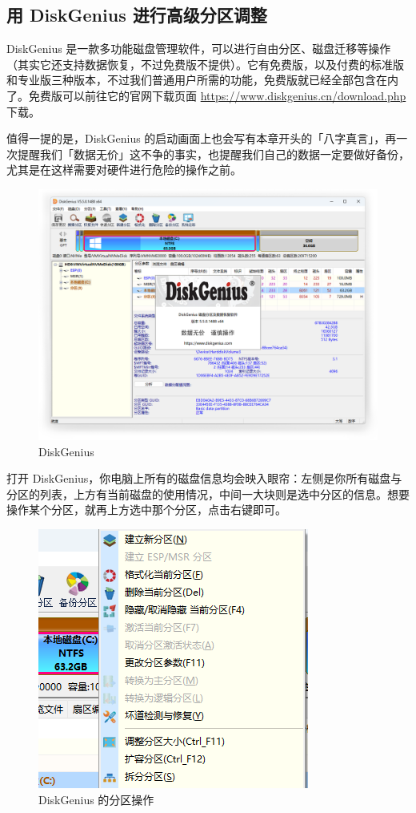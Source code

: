{\subsection{用 DiskGenius 进行高级分区调整}

DiskGenius 是一款多功能磁盘管理软件，可以进行自由分区、磁盘迁移等操作（其实它还支持数据恢复，不过免费版不提供）。它有免费版，以及付费的标准版和专业版三种版本，不过我们普通用户所需的功能，免费版就已经全部包含在内了。免费版可以前往它的官网下载页面 \url{https://www.diskgenius.cn/download.php} 下载。

值得一提的是，DiskGenius 的启动画面上也会写有本章开头的「八字真言」，再一次提醒我们「数据无价」这不争的事实，也提醒我们自己的数据一定要做好备份，尤其是在这样需要对硬件进行危险的操作之前。

\begin{figure}[htb!]
  \centering
  \includegraphics[width=.7\textwidth]{assets/advanced/DiskGenius.png}
  \caption{DiskGenius}
  \label{fig:DiskGenius}
\end{figure}

打开 DiskGenius，你电脑上所有的磁盘信息均会映入眼帘：左侧是你所有磁盘与分区的列表，上方有当前磁盘的使用情况，中间一大块则是选中分区的信息。想要操作某个分区，就再上方选中那个分区，点击右键即可。

\begin{figure}[htb!]
  \centering
  \includegraphics[width=.5\textwidth]{assets/advanced/Part_Operation.png}
  \caption{DiskGenius 的分区操作}
  \label{fig:Part_Operation}
\end{figure}

}
